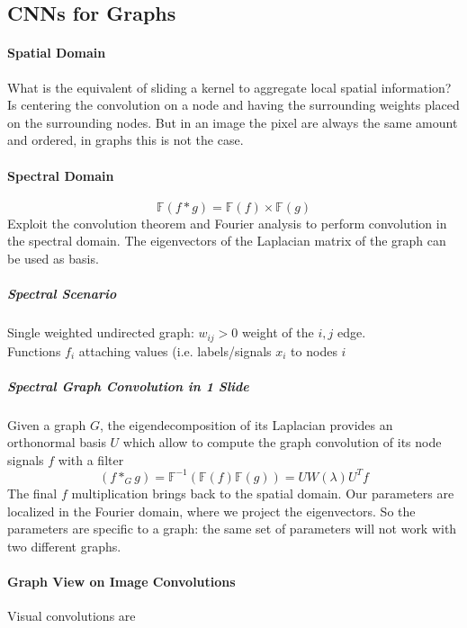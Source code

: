 \documentclass[10pt]{report}
\begin{document}
\subsection{CNNs for Graphs}
\paragraph{Spatial Domain} What is the equivalent of sliding a kernel to aggregate local spatial information? Is centering the convolution on a node and having the surrounding weights placed on the surrounding nodes. But in an image the pixel are always the same amount and ordered, in graphs this is not the case.
\paragraph{Spectral Domain} $$\mathbb{F}(f*g) = \mathbb{F}(f)\times
 \mathbb{F}(g)$$
Exploit the convolution theorem and Fourier analysis to perform convolution in the spectral domain. The eigenvectors of the Laplacian matrix of the graph can be used as basis.
\subparagraph{Spectral Scenario} Single weighted undirected graph: $w_{ij}>0$ weight of the $i,j$ edge.\\
Functions $f_i$ attaching values (i.e. labels/signals $x_i$ to nodes $i$ %
\subparagraph{Spectral Graph Convolution in 1 Slide} Given a graph $G$, the eigendecomposition of its Laplacian provides an orthonormal basis $U$ which allow to compute the graph convolution of its node signals $f$ with a filter 
$$(f*_G g) = \mathbb{F}^{-1}(\mathbb{F}(f)\mathbb{F}(g)) = UW(\lambda)U^Tf$$
The final $f$ multiplication brings back to the spatial domain. Our parameters are localized in the Fourier domain, where we project the eigenvectors. So the parameters are specific to a graph: the same set of parameters will not work with two different graphs.
\paragraph{Graph View on Image Convolutions} Visual convolutions are %
\end{document}
